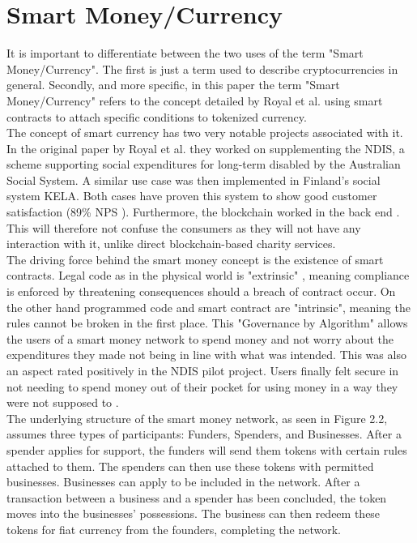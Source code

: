 \section*{Smart Money/Currency}
It is important to differentiate between the two uses of the term "Smart Money/Currency". The first is just a term used to describe cryptocurrencies in general. Secondly, and more specific, in this paper the term "Smart Money/Currency" refers to the concept detailed by Royal et al.\cite{royal} using smart contracts to attach specific conditions to tokenized currency.\\
The concept of smart currency has two very notable projects associated with it. In the original paper by Royal et al.\cite{royal} they worked on supplementing the NDIS, a scheme supporting social expenditures for long-term disabled by the Australian Social System. A similar use case was then implemented in Finland's social system KELA. Both cases have proven this system to show good customer satisfaction (89\% NPS \cite{weber}). Furthermore, the blockchain worked in the back end \cite{weber}\cite{kela}\cite{royal}. This will therefore not confuse the consumers as they will not have any interaction with it, unlike direct blockchain-based charity services.\\
The driving force behind the smart money concept is the existence of smart contracts. Legal code as in the physical world is "extrinsic" \cite{tackle}, meaning compliance is enforced by threatening consequences should a breach of contract occur. 
On the other hand programmed code and smart contract are "intrinsic", meaning the rules cannot be broken in the first place. This "Governance by Algorithm"\cite{tackle} allows the users of a smart money network to spend money and not worry about the expenditures they made not being in line with what was intended. This was also an aspect rated positively in the NDIS pilot project. Users finally felt secure in not needing to spend money out of their pocket for using money in a way they were not supposed to \cite{weber}\cite{tackle}.\\
The underlying structure of the smart money network, as seen in Figure 2.2, assumes three types of participants: Funders, Spenders, and Businesses. After a spender applies for support, the funders will send them tokens with certain rules attached to them. The spenders can then use these tokens with permitted businesses. Businesses can apply to be included in the network. After a transaction between a business and a spender has been concluded, the token moves into the businesses' possessions. The business can then redeem these tokens for fiat currency from the founders, completing the network.\\
